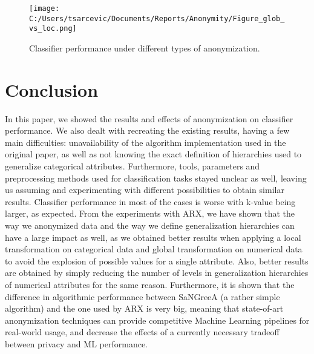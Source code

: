 \documentclass{article}
\begin{document}
\begin{figure}
	\texttt{[image: C:/Users/tsarcevic/Documents/Reports/Anonymity/Figure\_glob\_vs\_loc.png]}
	\caption{Classifier performance under different types of anonymization.}
 	\label{fig:glob-vs-loc}
\end{figure}


\section{Conclusion}
In this paper, we showed the results and effects of anonymization on classifier performance. We also dealt with recreating the existing results, having a few main difficulties: unavailability of the algorithm implementation used in the original paper, as well as not knowing the exact definition of hierarchies used to generalize categorical attributes. Furthermore, tools, parameters and preprocessing methods used for classification tasks stayed unclear as well, leaving us assuming and experimenting with different possibilities to obtain similar results. Classifier performance in most of the cases is worse with k-value being larger, as expected. From the experiments with ARX, we have shown that the way we anonymized data and the way we define generalization hierarchies can have a large impact as well, as we obtained better results when applying a local transformation on categorical data and global transformation on numerical data to avoid the explosion of possible values for a single attribute. Also, better results are obtained by simply reducing the number of levels in generalization hierarchies of numerical attributes for the same reason. Furthermore, it is shown that the difference in algorithmic performance between SaNGreeA (a rather simple algorithm) and the one used by ARX is very big, meaning that state-of-art anonymization techniques can provide competitive Machine Learning pipelines for real-world usage, and decrease the effects of a currently necessary tradeoff between privacy and ML performance. 
\newpage



\end{document}
